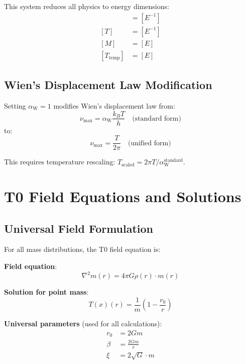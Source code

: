 \documentclass[12pt,a4paper]{article}
\newcommand{\Tfield}{T(x)}
\newcommand{\alphaW}{\alpha_{\text{W}}}
\begin{document}
	This system reduces all physics to energy dimensions:
	\begin{align}
		[L] &= [E^{-1}] \\
		[T] &= [E^{-1}] \\
		[M] &= [E] \\
		[T_{\text{temp}}] &= [E]
	\end{align}
	
	\subsection{Wien's Displacement Law Modification}
	\label{subsec:wien_modification}
	
	Setting $\alphaW = 1$ modifies Wien's displacement law from:
	\begin{equation}
		\nu_{\max} = \alphaW \frac{k_B T}{h} \quad \text{(standard form)}
	\end{equation}
	to:
	\begin{equation}
		\nu_{\max} = \frac{T}{2\pi} \quad \text{(unified form)}
	\end{equation}
	
	This requires temperature rescaling: $T_{\text{scaled}} = 2\pi T / \alphaW^{\text{standard}}$.
	
	\section{T0 Field Equations and Solutions}
	\label{sec:field_equations}
	
	\subsection{Universal Field Formulation}
	\label{subsec:universal_formulation}
	
	For all mass distributions, the T0 field equation is:
	
	\textbf{Field equation}:
	\begin{equation}
		\nabla^2 m(r) = 4\pi G \rho(r) \cdot m(r)
	\end{equation}
	
	\textbf{Solution for point mass}:
	\begin{equation}
		\Tfield(r) = \frac{1}{m}\left(1 - \frac{r_0}{r}\right)
	\end{equation}
	
	\textbf{Universal parameters} (used for all calculations):
	\begin{align}
		r_0 &= 2Gm \\
		\beta &= \frac{2Gm}{r} \\
		\xi &= 2\sqrt{G} \cdot m
	\end{align}
	
\end{document}
